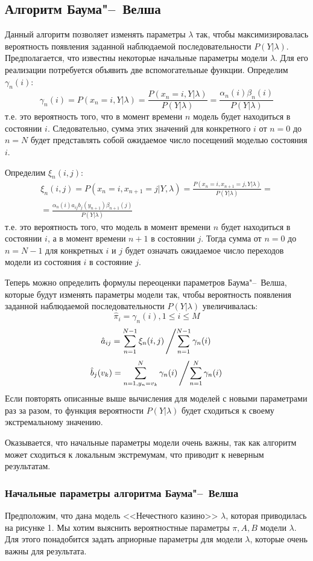 \documentclass[]{article}
\begin{document}
	
	\subsection{Алгоритм Баума"--~Велша}
		Данный алгоритм позволяет изменять параметры $\lambda$ так, чтобы максимизировалась вероятность появления заданной наблюдаемой последовательности $P(Y|\lambda)$. Предполагается, что известны некоторые начальные параметры модели $\lambda$. Для его реализации потребуется объявить две вспомогательные функции. Определим $\gamma_{n}(i)$:
		\[
			\gamma_{n}(i) = P(x_{n} = i, Y|\lambda) = \frac{P(x_{n}=i, Y|\lambda)}{P(Y|\lambda)} = \frac{\alpha_{n}(i)\beta_{n}(i)}{P( Y|\lambda)}
		\]
		т.е. это вероятность того, что в момент времени $n$ модель будет находиться в состоянии $i$. Следовательно, сумма этих значений для конкретного $i$ от $n=0$ до $n=N$ будет представлять собой ожидаемое число посещений моделью состояния $i$.
		
		Определим $\xi_{n}(i,j)$:
		\begin{multline*}
			\xi_{n}(i,j) = P(x_{n} = i, x_{n+1} = j | Y, \lambda) = \frac{P(x_{n} = i, x_{n+1} = j, Y | \lambda)}{P(Y | \lambda)} =\\= \frac{\alpha_{n}(i)a_{ij}b_{j}(y_{n+1})\beta_{n+1}(j)}{P(Y|\lambda)}
		\end{multline*}
		т.е. это вероятность того, что модель в момент времени $n$ будет находиться в состоянии $i$, а в момент времени $n+1$ в состоянии $j$. Тогда сумма от $n=0$ до $n=N-1$ для конкретных $i$ и $j$ будет означать ожидаемое число переходов модели из состояния $i$ в состояние $j$.
		
		Теперь можно определить формулы переоценки параметров Баума"--~Велша, которые будут изменять параметры модели так, чтобы вероятность появления заданной наблюдаемой последовательности $P(Y|\lambda)$ увеличивалась: 
		\[
			\hat{\pi}_{i} = \gamma_{n}(i), 1 \leq i \leq M
		\]
		\[
			\hat{a}_{ij} = \sum_{n=1}^{N-1}{\xi_{n}(i,j)} \left/ \sum_{n=1}^{N-1}{\gamma_{n}(i)} \right.
		\]
		\[
			\hat{b}_{j}(v_{k}) = \sum_{n=1, y_{n}=v_{k}}^{N}{\gamma_{n}(i)} \left/ \sum_{n=1}^{N}{\gamma_{n}(i)} \right.
		\] 
		Если повторять описанные выше вычисления для моделей с новыми параметрами раз за разом, то функция вероятности $P(Y|\lambda)$ будет сходиться к своему экстремальному значению. 
		
		Оказывается, что начальные параметры модели очень важны, так как алгоритм может сходиться к локальным экстремумам, что приводит к неверным результатам.
		
		\subsubsection{Начальные параметры алгоритма Баума"--~Велша}
			Предположим, что дана модель <<Нечестного казино>> $\lambda$, которая приводилась на рисунке 1. Мы хотим выяснить вероятностные параметры $\pi, A, B$ модели $\lambda$. Для этого понадобится задать априорные параметры для модели $\lambda$, которые очень важны для результата. 
			
\end{document}

